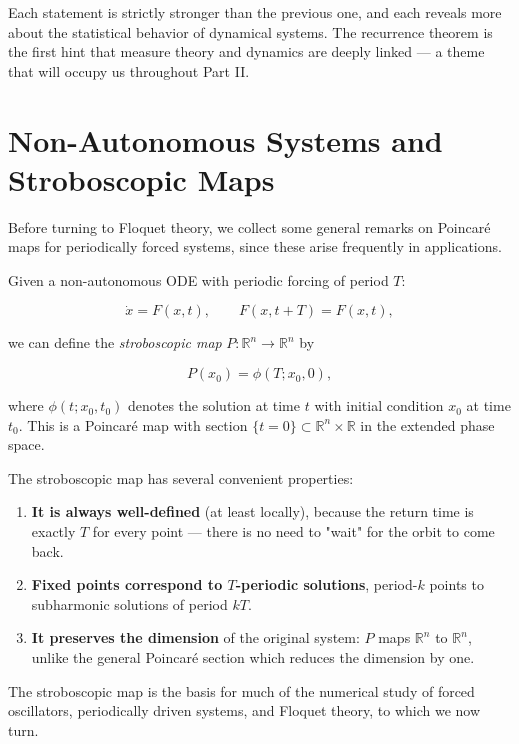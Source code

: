 Each statement is strictly stronger than the previous one, and each reveals more about the statistical behavior of dynamical systems. The recurrence theorem is the first hint that measure theory and dynamics are deeply linked --- a theme that will occupy us throughout Part II.


\section{Non-Autonomous Systems and Stroboscopic Maps}\label{sec:4.6}

Before turning to Floquet theory, we collect some general remarks on Poincaré maps for periodically forced systems, since these arise frequently in applications.

Given a non-autonomous ODE with periodic forcing of period $T$:

\[
\dot{x} = F(x, t), \qquad F(x, t + T) = F(x, t),
\]

we can define the \textit{stroboscopic map} $P: \mathbb{R}^n \to \mathbb{R}^n$ by

\[
P(x_0) = \phi(T; x_0, 0),
\]

where $\phi(t; x_0, t_0)$ denotes the solution at time $t$ with initial condition $x_0$ at time $t_0$. This is a Poincaré map with section $\{t = 0\} \subset \mathbb{R}^n \times \mathbb{R}$ in the extended phase space.

The stroboscopic map has several convenient properties:

\begin{enumerate}[nosep]
  \item \textbf{It is always well-defined} (at least locally), because the return time is exactly $T$ for every point --- there is no need to "wait" for the orbit to come back.

  \item \textbf{Fixed points correspond to $T$-periodic solutions}, period-$k$ points to subharmonic solutions of period $kT$.

  \item \textbf{It preserves the dimension} of the original system: $P$ maps $\mathbb{R}^n$ to $\mathbb{R}^n$, unlike the general Poincaré section which reduces the dimension by one.
\end{enumerate}

The stroboscopic map is the basis for much of the numerical study of forced oscillators, periodically driven systems, and Floquet theory, to which we now turn.


